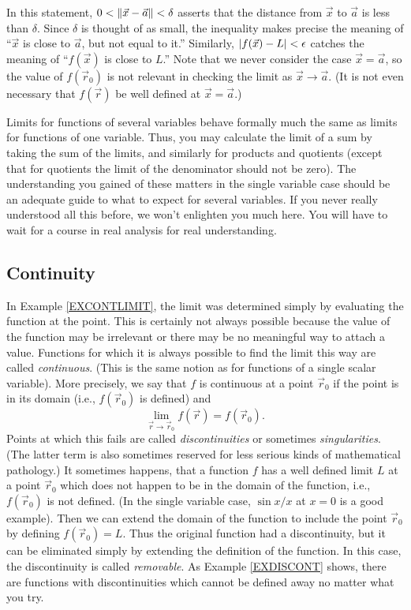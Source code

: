 In this statement, $0<\lVert\vec x - \vec a\rVert < \delta$ asserts that the distance
from $\vec x$ to $\vec a$ is less than $\delta$.  Since $\delta$ is
thought of as small, the inequality  makes precise the meaning of
``$\vec x$ is close to $\vec a$, but not equal to it.''   Similarly, $\lvert f(\vec x) - L\rvert < 
\epsilon$ catches the meaning of ``$f(\vec x)$ is close to 
$L$.''  Note that we never consider the case $\vec x = \vec a$,
so the value of $f(\vec r_0)$
 is not relevant in checking the limit as $\vec x \to \vec a$.
(It is not even necessary that $f(\vec r)$  be well defined at
$\vec x = \vec a$.)

Limits for functions of several variables behave formally much
the same as limits for functions of one variable.  Thus, you
may calculate the limit of a sum by taking the sum of the
limits, and similarly for products and quotients (except that
for quotients the limit of the denominator should not be zero).
The understanding you gained of these matters in the single
variable case should be an adequate guide to what to expect
for several variables.  If you never really understood all this
before, we won't enlighten you much here.  You will have to
wait for a course in real analysis for real understanding.

\subsection{Continuity}
In Example \ref{EXCONTLIMIT}, the limit was determined simply by evaluating the
function at the point.  This is certainly not always possible
because the value of the function may be irrelevant or there
may be no 
meaningful 
way to 
attach a value.   Functions
for which it is always possible to find the limit this way
 are called
\emph{continuous}.  (This is the same notion as for functions
of a single scalar variable).  More precisely, we say that
$f$ is continuous at a point $\vec r_0$ if the point is in its domain (i.e.,
$f(\vec r_0)$ is defined) and
\[
  \lim_{\vec r \to \vec r_0} f(\vec r) = f(\vec r_0).
\]
Points at which this fails  are called \emph{discontinuities}
or sometimes \emph{singularities}.   (The latter term is also sometimes
reserved for less serious kinds of mathematical pathology.)  It
sometimes happens, that a function $f$ has a well defined limit $L$ at
a point $\vec r_0$ which does not happen to be in the domain of the function,
i.e., $f(\vec r_0)$ is not defined.  (In the single variable case,
$\sin x/ x$ at $x = 0$ is a good example).  Then we can extend the
domain of the function to include the point $\vec r_0$ by defining
$f(\vec r_0) = L$.   Thus the original function had a discontinuity,
but it can be eliminated simply by extending the definition of the
function.  In this case, the discontinuity is called
\emph{removable}.   As Example \ref{EXDISCONT} shows, there are functions
with  discontinuities
which cannot be defined away no matter what you try.  
 
